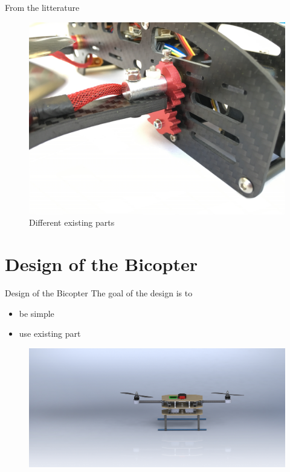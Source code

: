 \documentclass{beamer}
\begin{document}
\begin{frame}{From the litterature}
\begin{figure}
\includegraphics[scale=0.11]{pictures/bicopter3}
\caption{Different existing parts}
\end{figure}
\end{frame}

\section{Design of the Bicopter}
\begin{frame}{Design of the Bicopter}
The goal of the design is to
\begin{itemize}
\item be simple
\item use existing part
\end{itemize}
\begin{figure}
\includegraphics[scale=0.07]{pictures/picture4}
\end{figure}
\end{frame}
\end{document}
